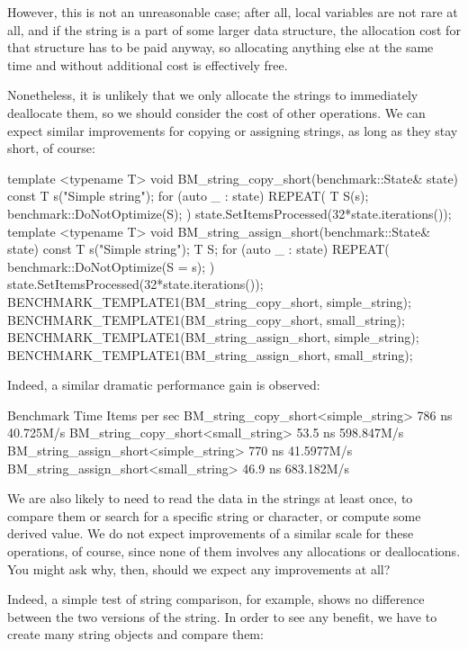 However, this is not an unreasonable case; after all, local variables are not rare at all, and if the string is a part of some larger data structure, the allocation cost for that structure has to be paid anyway, so allocating anything else at the same time and without additional cost is effectively free.

Nonetheless, it is unlikely that we only allocate the strings to immediately deallocate them, so we should consider the cost of other operations. We can expect similar improvements for copying or assigning strings, as long as they stay short, of course:

\begin{code}
template <typename T>
void BM_string_copy_short(benchmark::State& state) {
  const T s("Simple string");
  for (auto _ : state) {
    REPEAT({
      T S(s);
      benchmark::DoNotOptimize(S);
    })
  }
  state.SetItemsProcessed(32*state.iterations());
}
template <typename T>
void BM_string_assign_short(benchmark::State& state) {
  const T s("Simple string");
  T S;
  for (auto _ : state) {
    REPEAT({ benchmark::DoNotOptimize(S = s); })
  }
  state.SetItemsProcessed(32*state.iterations());
}
BENCHMARK_TEMPLATE1(BM_string_copy_short, simple_string);
BENCHMARK_TEMPLATE1(BM_string_copy_short, small_string);
BENCHMARK_TEMPLATE1(BM_string_assign_short, simple_string);
BENCHMARK_TEMPLATE1(BM_string_assign_short, small_string);
\end{code}

Indeed, a similar dramatic performance gain is observed:

\begin{code}
Benchmark                                Time Items per sec
BM_string_copy_short<simple_string>       786 ns 40.725M/s
BM_string_copy_short<small_string>       53.5 ns 598.847M/s
BM_string_assign_short<simple_string>     770 ns 41.5977M/s
BM_string_assign_short<small_string>     46.9 ns 683.182M/s
\end{code}

We are also likely to need to read the data in the strings at least once, to compare them or search for a specific string or character, or compute some derived value. We do not expect improvements of a similar scale for these operations, of course, since none of them involves any allocations or deallocations. You might ask why, then, should we expect any improvements at all?

Indeed, a simple test of string comparison, for example, shows no difference between the two versions of the string. In order to see any benefit, we have to create many string objects and compare them:

